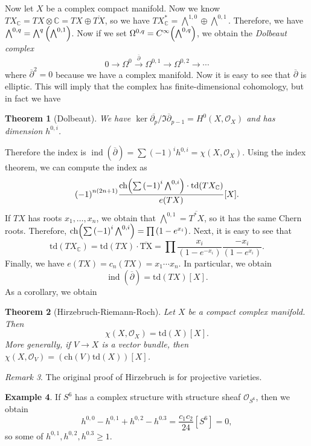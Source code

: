 \documentclass[leqno, openany]{memoir}
\newtheorem{thm}{Theorem}[section]
\theoremstyle{definition}
\newtheorem{exm}[thm]{Example}
\theoremstyle{remark}
\newtheorem{rmk}[thm]{Remark}
\theoremstyle{plain}
\theoremstyle{definition}
\theoremstyle{remark}
\newcommand{\C}{\mathbb{C}}
\newcommand{\mc}[1]{\mathcal{#1}}
\newcommand{\mr}[1]{\mathrm{#1}}
\newcommand{\ol}[1]{\overline{#1}}
\DeclareMathOperator{\ind}{ind}
\begin{document}
Now let $X$ be a complex compact manifold. Now we know $TX_{\C} = TX \otimes \C
= TX \oplus \ol{TX}$, so we have $TX_{\C}^* = \bigwedge^{1,0} \oplus
\bigwedge^{0,1}$. Therefore, we have $\bigwedge^{0,q} = \bigwedge^q
\qty(\bigwedge^{0,1})$. Now if we set $\Omega^{0,q} =
C^{\infty}\qty(\bigwedge^{0,q})$, we obtain the \textit{Dolbeaut complex} \[ 0
\to \Omega^0 \xrightarrow{\ol{\partial}} \Omega^{0,1} \to \Omega^{0,2} \to
\cdots \] where $\ol{\partial}^2 = 0$ because we have a complex manifold. Now
it is easy to see that $\ol{\partial}$ is elliptic. This will imply that the
complex has finite-dimensional cohomology, but in fact we have
\begin{thm}[Dolbeaut] We have $\ker \ol{\partial_p}/\Im \ol{\partial}_{p-1} =
H^0(X, \mc{O}_X)$ and has dimension $h^{0,i}$.  \end{thm} Therefore the index
is $\ind(\ol{\partial}) = \sum {(-1)}^i h^{0,i} = \chi(X, \mc{O}_X)$. Using the
index theorem, we can compute the index as \begin{align*} {(-1)}^{n(2n+1)}
\frac{\mr{ch}\qty(\sum {(-1)}^i \bigwedge^{0,i}) \cdot \mr{td}(TX_{\C})}{e(TX)}
[X].  \end{align*} If $TX$ has roots $x_1, \ldots, x_n$, we obtain that
$\bigwedge^{0,1} = \ol{T^*X}$, so it has the same Chern roots. Therefore,
$\mr{ch}\qty(\sum {(-1)}^i \bigwedge^{0,i}) = \prod {(1-e^{x_i})}$. Next, it is
easy to see that \[ \mr{td}(TX_{\C}) = \mr{td}(TX) \cdot \mr{\ol{TX}} = \prod
    \frac{x_i}{(1-e^{-x_i})} \frac{-x_i}{(1-e^{x_i})}. \] Finally, we have
    $e(TX) = c_n(TX) = x_1 \cdots x_n$. In particular, we obtain \[
    \ind(\ol{\partial}) = \mr{td}(TX) [X]. \] As a corollary, we obtain
    \begin{thm}[Hirzebruch-Riemann-Roch] Let $X$ be a compact complex manifold.
        Then \[ \chi(X, \mc{O}_X) = \mr{td}(X) [X]. \] More generally, if $V
        \to X$ is a vector bundle, then $\chi(X, \mc{O}_V) = (\mr{ch}(V)
        \mr{td}(X)) [X]$.  \end{thm}

\begin{rmk} The original proof of Hirzebruch is for projective varieties.
\end{rmk}

\begin{exm} If $S^6$ has a complex structure with structure sheaf
    $\mc{O}_{S^6}$, then we obtain \[ h^{0,0} - h^{0,1} + h^{0,2} - h^{0.3} =
    \frac{c_1 c_2}{24} [S^6] = 0, \] so some of $h^{0,1}, h^{0,2}, h^{0.3} \geq
1$.  \end{exm}
\end{document}
